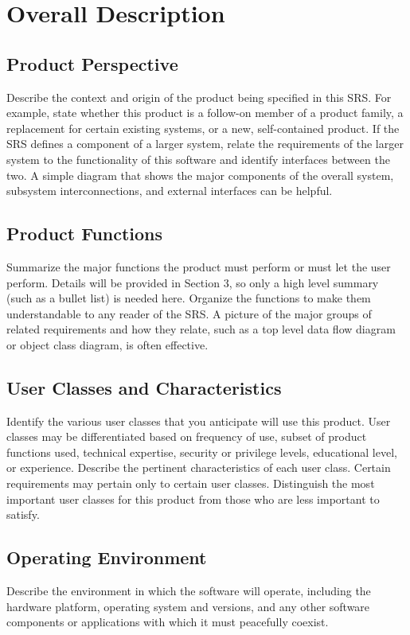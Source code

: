 \documentclass[a4paper,10pt]{article}
\begin{document}
\section{Overall Description}
\subsection{Product Perspective}
Describe the context and origin of the product being specified in this SRS. For example, state whether this product is a follow-on member of a product family, a replacement for certain existing systems, or a new, self-contained product. If the SRS defines a component of a larger system, relate the requirements of the larger system to the functionality of this software and identify interfaces between the two. A simple diagram that shows the major components of the overall system, subsystem interconnections, and external interfaces can be helpful.
\subsection{Product Functions}
Summarize the major functions the product must perform or must let the user perform. Details will be provided in Section 3, so only a high level summary (such as a bullet list) is needed here. Organize the functions to make them understandable to any reader of the SRS. A picture of the major groups of related requirements and how they relate, such as a top level data flow diagram or object class diagram, is often effective.
\subsection{User Classes and Characteristics}
Identify the various user classes that you anticipate will use this product. User classes may be differentiated based on frequency of use, subset of product functions used, technical expertise, security or privilege levels, educational level, or experience. Describe the pertinent characteristics of each user class. Certain requirements may pertain only to certain user classes. Distinguish the most important user classes for this product from those who are less important to satisfy.
\subsection{Operating Environment}
Describe the environment in which the software will operate, including the hardware platform, operating system and versions, and any other software components or applications with which it must peacefully coexist.
\end{document}
